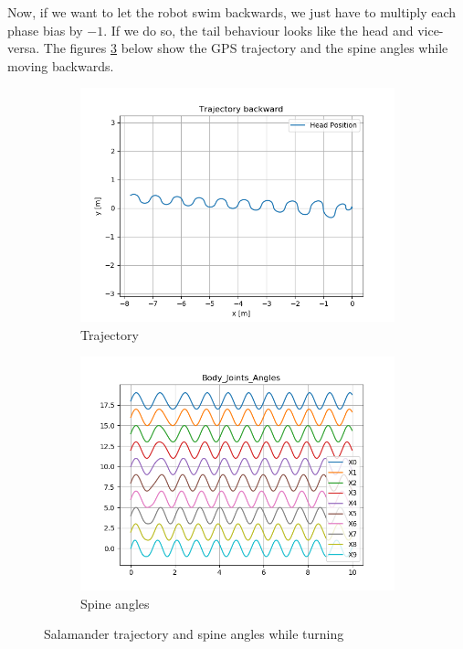 \documentclass{cmc}
\begin{document}
Now, if we want to let the robot swim backwards, we just have to multiply each phase bias by $-1$. If we do so, the tail behaviour looks like the head and vice-versa.
The figures \ref{fig:exercise8d2_behaviour} below show the GPS trajectory and the spine angles while moving backwards.
\begin{figure}[H] 
  \begin{subfigure}[b]{0.5\linewidth}
    \centering
    \includegraphics[width=0.9\linewidth]{figures/Trajectory_8d2.png} 
    \caption{Trajectory} 
    \label{fig:exercise8d2_behaviour:a} 
  \end{subfigure}%
  \begin{subfigure}[b]{0.5\linewidth}
    \centering
    \includegraphics[width=0.9\linewidth]{figures/phase_angle_body_8d2.png} 
    \caption{Spine angles} 
    \label{fig:exercise8d2_behaviour:b} 
  \end{subfigure}
  \caption{Salamander trajectory and spine angles while turning}
  \label{fig:exercise8d2_behaviour} 
\end{figure}
\end{document}
